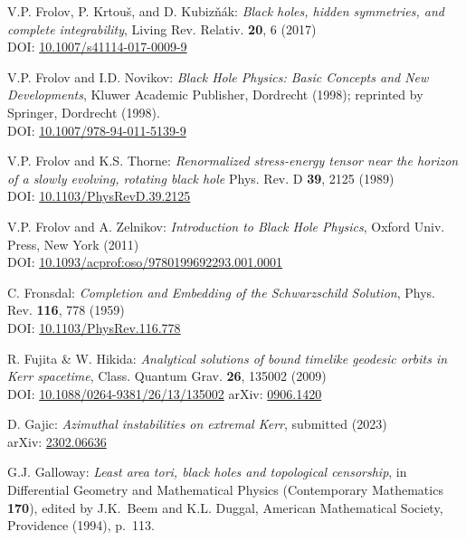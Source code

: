 \begin{thebibliography}{123}
V.P. Frolov, P. Krtouš, and D. Kubizňák:
{\em Black holes, hidden symmetries, and complete integrability},
Living Rev. Relativ. {\bf 20}, 6 (2017) \\
DOI: \href{https://doi.org/10.1007/s41114-017-0009-9}{10.1007/s41114-017-0009-9}

V.P. Frolov and I.D. Novikov:
{\em Black Hole Physics: Basic Concepts and New Developments},
Kluwer Academic Publisher, Dordrecht (1998); reprinted by
Springer, Dordrecht (1998). \\
DOI: \href{https://doi.org/10.1007/978-94-011-5139-9}{10.1007/978-94-011-5139-9}

V.P. Frolov and K.S. Thorne:
{\em Renormalized stress-energy tensor near the horizon of a slowly evolving, rotating black hole}
Phys. Rev. D {\bf 39}, 2125 (1989)\\
DOI: \href{https://doi.org/10.1103/PhysRevD.39.2125}{10.1103/PhysRevD.39.2125}

V.P. Frolov and A. Zelnikov:
{\em Introduction to Black Hole Physics},
Oxford Univ. Press, New York (2011)\\
DOI: \href{https://doi.org/10.1093/acprof:oso/9780199692293.001.0001}{10.1093/acprof:oso/9780199692293.001.0001}

C. Fronsdal: {\em Completion and Embedding of the Schwarzschild Solution},
Phys. Rev. {\bf 116}, 778 (1959) \\
DOI: \href{https://doi.org/10.1103/PhysRev.116.778}{10.1103/PhysRev.116.778}

R. Fujita \& W. Hikida:
{\em Analytical solutions of bound timelike geodesic orbits in Kerr spacetime},
Class. Quantum Grav. {\bf 26}, 135002 (2009) \\
DOI: \href{https://doi.org/10.1088/0264-9381/26/13/135002}{10.1088/0264-9381/26/13/135002}\hfill
arXiv: \href{https://arxiv.org/abs/0906.1420}{0906.1420}

D. Gajic:
{\em Azimuthal instabilities on extremal Kerr},
submitted (2023)\\
arXiv: \href{https://arxiv.org/abs/2302.06636}{2302.06636}

G.J. Galloway:
{\em Least area tori, black holes and topological censorship},
in {\rm Differential Geometry and Mathematical Physics}
(Contemporary Mathematics {\bf 170}),
edited by  J.K.~Beem and K.L. Duggal,
American Mathematical Society, Providence (1994), p.~113.


\end{thebibliography}
